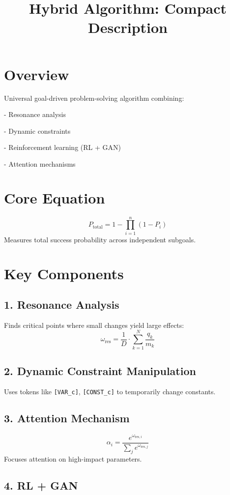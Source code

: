 \documentclass{article}
\title{Hybrid Algorithm: Compact Description}
\author{}
\date{}
\begin{document}
\maketitle

\section*{Overview}
Universal goal-driven problem-solving algorithm combining:

    
- Resonance analysis
    
- Dynamic constraints
    
- Reinforcement learning (RL + GAN)
    
- Attention mechanisms


\section*{Core Equation}
\[
P_{\text{total}} = 1 - \prod_{i=1}^n (1 - P_i)
\]
Measures total success probability across independent subgoals.

\section*{Key Components}
\subsection*{1. Resonance Analysis}
Finds critical points where small changes yield large effects:
\[
\omega_{\text{res}} = \frac{1}{D} \cdot \sum_{k=1}^N \frac{q_k}{m_k}
\]

\subsection*{2. Dynamic Constraint Manipulation}
Uses tokens like \texttt{[VAR\_c]}, \texttt{[CONST\_c]} to temporarily change constants.

\subsection*{3. Attention Mechanism}
\[
\alpha_i = \frac{e^{\omega_{\text{res},i}}}{\sum_j e^{\omega_{\text{res},j}}}
\]
Focuses attention on high-impact parameters.

\subsection*{4. RL + GAN}
\end{document}
